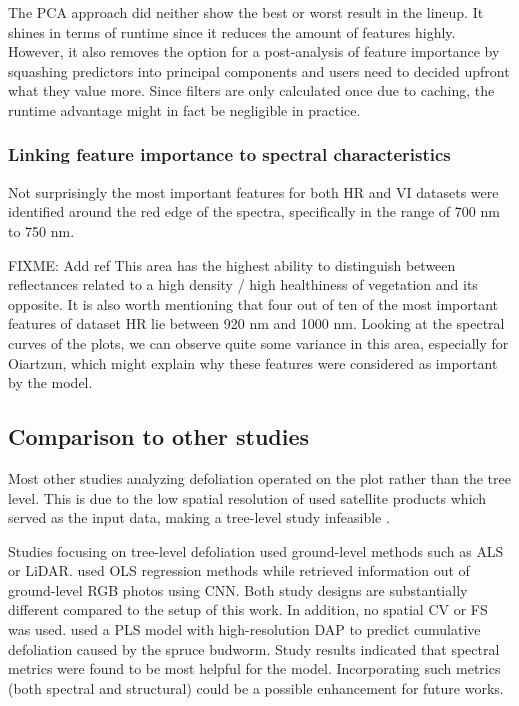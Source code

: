 \documentclass[letterpaper, peerreview]{IEEEtran}
\begin{document}
The PCA approach did neither show the best or worst result in the lineup.
It shines in terms of runtime since it reduces the amount of features highly.
However, it also removes the option for a post-analysis of feature importance by squashing predictors into principal components and users need to decided upfront what they value more.
Since filters are only calculated once due to caching, the runtime advantage might in fact be negligible in practice.

\subsubsection{Linking feature importance to spectral characteristics}

Not surprisingly the most important features for both HR and VI datasets were identified around the red edge of the spectra, specifically in the range of 700 nm to 750 nm.

FIXME: Add ref
This area has the highest ability to distinguish between reflectances related to a high density / high healthiness of vegetation and its opposite.
It is also worth mentioning that four out of ten of the most important features of dataset HR lie between 920 nm and 1000 nm.
Looking at the spectral curves of the plots, we can observe quite some variance in this area, especially for Oiartzun, which might explain why these features were considered as important by the model.

\subsection{Comparison to other studies}

\noindent Most other studies analyzing defoliation operated on the plot rather than the tree level.
This is due to the low spatial resolution of used satellite products which served as the input data, making a tree-level study infeasible \cite{townsend2012, debeurs2008, rengarajan2016}.

Studies focusing on tree-level defoliation used ground-level methods such as \ac{ALS} or \ac{LiDAR}\cite{meng2018, kalin2019}.
\cite{meng2018} used \ac{OLS} regression methods while\cite{kalin2019} retrieved information out of ground-level RGB photos using \ac{CNN}.
Both study designs are substantially different compared to the setup of this work.
In addition, no spatial \ac{CV} or \ac{FS} was used.
\cite{goodbody2018} used a \ac{PLS} model with high-resolution \ac{DAP} to predict cumulative defoliation caused by the spruce budworm.
Study results indicated that spectral metrics were found to be most helpful for the model.
Incorporating such metrics (both spectral and structural) could be a possible enhancement for future works.
\end{document}
